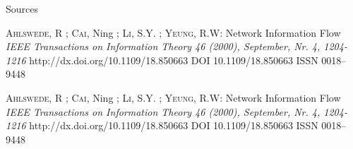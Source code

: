 \begin{frame}[allowframebreaks]{Sources}
\begin{thebibliography}{9}
    \textsc{Ahlswede}, R ; \textsc{Cai}, Ning  ; \textsc{Li},
      S.Y. ; \textsc{Yeung},  R.W:
    \newblock Network Information Flow
    \emph{IEEE Transactions on Information Theory 46 (2000), September, Nr. 4, 1204-1216}
    \newblock http://dx.doi.org/10.1109/18.850663
    \newblock DOI 10.1109/18.850663
    \newblock ISSN 0018–9448

    \textsc{Ahlswede}, R ; \textsc{Cai}, Ning  ; \textsc{Li},
      S.Y. ; \textsc{Yeung},  R.W:
    \newblock Network Information Flow
    \emph{IEEE Transactions on Information Theory 46 (2000), September, Nr. 4, 1204-1216}
    \newblock http://dx.doi.org/10.1109/18.850663
    \newblock DOI 10.1109/18.850663
    \newblock ISSN 0018–9448

  \end{thebibliography} 
  
\end{frame}
\multipleslidefalse
